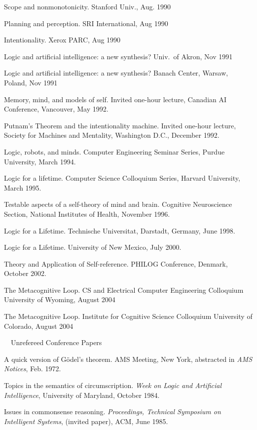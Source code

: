 {\expar
Scope and nonmonotonicity. Stanford Univ., Aug. 1990

\expar
Planning and perception. SRI International, Aug 1990

\expar
Intentionality. Xerox PARC, Aug 1990

\expar
Logic and artificial intelligence: a new synthesis? Univ.~of Akron,
Nov 1991

\expar
Logic and artificial intelligence: a new synthesis? Banach Center,
Warsaw, Poland, Nov 1991

\expar
Memory, mind, and models of self. Invited one-hour lecture, Canadian
AI Conference, Vancouver, May 1992.

\expar
Putnam's Theorem and the intentionality machine. Invited one-hour
lecture, Society for Machines and Mentality, Washington D.C., December
1992. 

\expar
Logic, robots, and minds.
Computer Engineering Seminar Series,
Purdue University, March 1994.

\expar
Logic for a lifetime.
Computer Science Colloquium Series,
Harvard University, March 1995.

\expar
Testable aspects of a self-theory of mind and brain.
Cognitive Neuroscience Section,
National Institutes of Health, November 1996.

\expar
Logic for a Lifetime.
Technische Universitat, Darstadt, Germany, June 1998.

\expar
Logic for a Lifetime.
University of New Mexico, July 2000.

\expar
Theory and Application of Self-reference.
PHILOG Conference, Denmark, October 2002.

\expar
The Metacognitive Loop.
CS and Electrical Computer Engineering Colloquium
University of Wyoming, August 2004

\expar
The Metacognitive Loop.
Institute for Cognitive Science Colloquium
University of Colorado, August 2004


\subsubsec ~~Unrefereed Conference Papers

\paper
A quick version of G\"{o}del's theorem.
AMS Meeting, New York, abstracted in
{\sl AMS Notices}, 
Feb. 1972.

\paper
Topics in the semantics of circumscription.
{\sl Week on Logic and Artificial Intelligence},
University of Maryland, October 1984.

\paper
Issues in commonsense reasoning.
{\sl Proceedings, Technical Symposium on Intelligent Systems}, 
(invited paper), ACM, June 1985.

}
